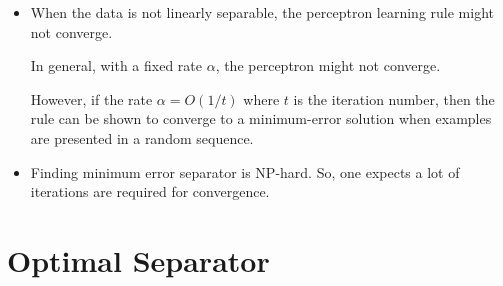\documentclass[10pt]{article}
\begin{document}
\begin{itemize}
    \item When the data is not linearly separable, the perceptron
        learning rule might not converge.
        
        In general, with a fixed rate $\alpha$, the perceptron
        might not converge. 
        
        However, if the rate $\alpha = O(1/t)$
        where $t$ is the iteration number, then the rule can
        be shown to converge to a minimum-error solution when
        examples are presented in a random sequence.
        
    \item Finding minimum error separator is NP-hard. So, one
        expects a lot of iterations are required for convergence.   
\end{itemize}

\section{Optimal Separator}
\end{document}
